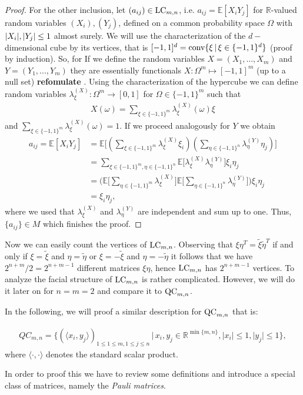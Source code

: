 \begin{proof}
	For the other inclusion, let $ (a_{ij}) \in \textup{LC}_{m,n} $, i.e. $ a_{ij} = \mathbb{E}[X_iY_j] $ for $ \mathbb{R} $-valued random variables $ (X_i),(Y_j) $, defined on a common probability space $ \Omega $ with $ {\left|{X_i}\right|},{\left|{Y_j}\right|} \le 1 $ almost surely. 
	We will use the characterization of the $ d-$dimensional cube by its vertices, that is $ [-1,1]^d = \textup{conv} \{\xi \, | \, \xi \in \{-1,1 \}^d \}$ (proof by induction). So, for 
	If we define the random variables $ X= (X_1,...,X_m) $ and $ Y= (Y_1,...,Y_m) $ they are essentially functionals 
	$ X: \Omega^m \mapsto [-1,1]^m $ (up to a null set) {\textbf{refomulate }}. Using the characterization of the hypercube we can define random variables $ \lambda_{\xi}^{(X)}: \Omega^m \to [0,1] $ for $ \Omega \in \{-1,1\}^m $ such that 
	\begin{align*}
		X(\omega) = \sum_{\xi \in \{-1,1\}^m}\lambda_{\xi}^{(X)}(\omega)\xi
	\end{align*} 
	and $ \sum_{\xi \in \{-1,1\}^m}\lambda_{\xi}^{(X)}(\omega) = 1  $. 
	If we proceed analogously for $ Y $ we obtain
	\begin{align*}
		a_{ij} = \mathbb{E}[X_iY_j] &= \mathbb{E} \big [  (\sum_{\xi \in \{-1,1\}^m}\lambda_{\xi}^{(X)}\xi_i ) (\sum_{\eta \in \{-1,1\}^n}\lambda_{\eta}^{(Y)}\eta_j ) \big ]   \\
		&= \sum_{\xi \in \{-1,1\}^m, \eta \in \{-1,1\}^n} \mathbb{E}\big [\lambda_{\xi}^{(X)}\lambda_{\eta}^{(Y)} \big ] \xi_i \eta_j  \\
		&=\Big ( \mathbb{E}\big [\sum_{\eta \in \{-1,1\}^m}\lambda_{\xi}^{(X)} \big ] \mathbb{E}\big [\sum_{\eta \in \{-1,1\}^n}\lambda_{\eta}^{(Y)} \big ] \Big ) \xi_i \eta_j  \\
		&= \xi_i\eta_j,
	\end{align*}
	where we used that $ \lambda_{\xi}^{(X)} $ and $ \lambda_{\eta}^{(Y)} $ are independent and sum up to one. 
	Thus, $ \{ a_{ij}\} \in M $ which finishes the proof. 
\end{proof}
Now we can easily count the vertices of $ \textup{LC}_{m,n} $. Observing that $ \xi \eta^T = \tilde{\xi} \tilde{\eta}^T $ if and only if $ \xi = \tilde{\xi} $ and $ \eta = \tilde{\eta} $ or $ \xi = -\tilde{\xi} $ and $ \eta = -\tilde{\eta} $ it follows that we have $ 2^{n+m}/2 = 2^{n+m-1} $ different matrices $ \xi \eta $, hence $ \textup{LC}_{m,n} $ has $ 2^{n+m-1} $ vertices. To analyze the facial structure of $ \textup{LC}_{m,n} $ is rather complicated. 
However, we will do it later on for $ n=m=2 $ and compare it to $ \textup{QC}_{m,n} $.

In the following, we will proof a similar description for $ \textup{QC}_{m,n} $ that is: 
\begin{lemma}\label{LemQC}
	\begin{align*}\label{EqQC}
		QC_{m,n} = \{ (\langle x_i,y_j \rangle)_{1 \le 1 \le m, 1 \le j \le n} \,| \, x_i,y_j \in \mathbb{R}^{ \min \{m,n \} }, \vert x_i  \vert \le 1, \vert y_j \vert \le 1  \},
	\end{align*}
	where $ \langle \cdot , \cdot \rangle $ denotes the standard scalar product. 
\end{lemma}
In order to proof this we have to review some definitions and introduce a special class of matrices, namely the {\itshape Pauli matrices}.

